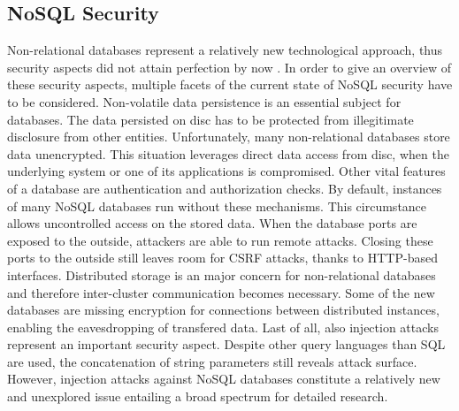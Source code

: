\subsection{NoSQL Security}
Non-relational databases represent a relatively new technological approach, thus security aspects did not attain perfection by now \cite{Okman:2011, Noiumkar:2014}. In order to give an overview of these security aspects, multiple facets of the current state of NoSQL security have to be considered. Non-volatile data persistence is an essential subject for databases. The data persisted on disc has to be protected from illegitimate disclosure from other entities. Unfortunately, many non-relational databases store data unencrypted. This situation leverages direct data access from disc, when the underlying system or one of its applications is compromised. Other vital features of a database are authentication and authorization checks. By default, instances of many NoSQL databases run without these mechanisms. This circumstance allows uncontrolled access on the stored data. When the database ports are exposed to the outside, attackers are able to run remote attacks. Closing these ports to the outside still leaves room for CSRF attacks, thanks to HTTP-based interfaces. Distributed storage is an major concern for non-relational databases and therefore inter-cluster communication becomes necessary. Some of the new databases are missing encryption for connections between distributed instances, enabling the eavesdropping of transfered data. Last of all, also injection attacks represent an important security aspect. Despite other query languages than SQL are used, the concatenation of string parameters still reveals attack surface. However, injection attacks against NoSQL databases constitute a relatively new and unexplored issue entailing a broad spectrum for detailed research.


